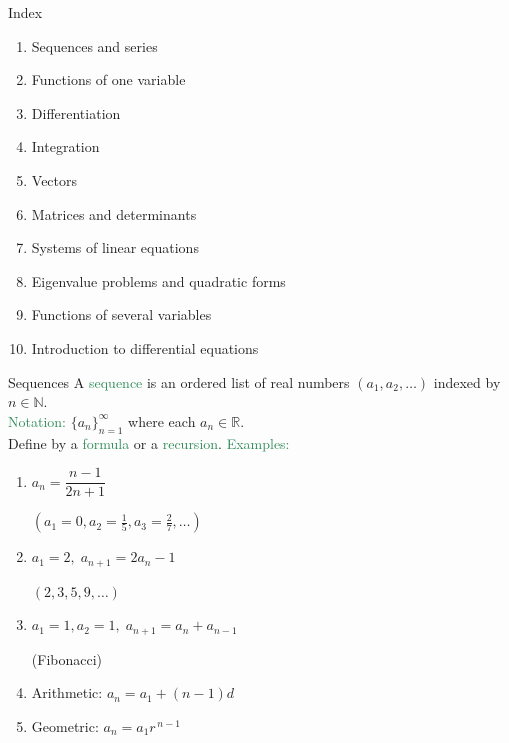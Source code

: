 \documentclass[11pt,aspectratio=169]{beamer}
\begin{document}
\begin{frame}{Index}

\begin{enumerate}
\item Sequences and series
\item Functions of one variable
\item Differentiation
\item Integration
\item Vectors
\item Matrices and determinants
\item Systems of linear equations
\item Eigenvalue problems and quadratic forms
\item Functions of several variables
\item Introduction to differential equations
\end{enumerate}
\end{frame}


\begin{frame}{Sequences }
%
A \textcolor{SeaGreen}{sequence} is an ordered list of real numbers $(a_1,a_2,\ldots)$ indexed by $n\in\mathbb{N}$. \\[3mm]

\textcolor{SeaGreen}{Notation:} $\{a_n\}_{n=1}^{\infty}$ where each $a_n\in\mathbb{R}$.\\[6pt]
Define by a \textcolor{SeaGreen}{formula} or a \textcolor{SeaGreen}{recursion}.
\vskip 10pt
\textcolor{SeaGreen}{Examples:} 
\begin{enumerate}
\item $a_n=\dfrac{n-1}{2n+1}$\quad  \begin{tiny}$(a_1=0, a_2=\frac15,a_3=\frac27,\ldots)$ \end{tiny}
\item $a_1=2, \; a_{n+1}=2a_n-1$\quad  \begin{tiny}$(2,3,5,9,\ldots)$ \end{tiny}
\item $a_1=1, a_2=1, \; a_{n+1}=a_n+a_{n-1}$\quad  \begin{tiny}(Fibonacci)\end{tiny}
\item \alert{Arithmetic}: $a_{n}=a_1+(n-1)d$
\item \alert{Geometric}: $a_n=a_1 r^{\,n-1}$
\end{enumerate}
%
\end{frame}
\end{document}
